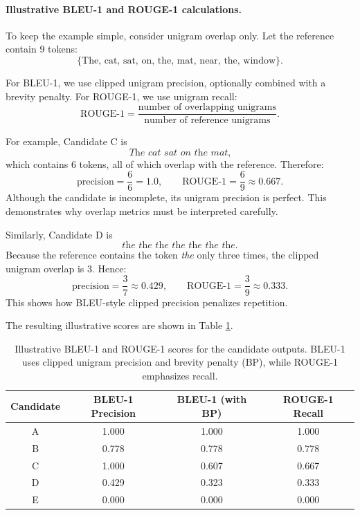 \documentclass{article}
\begin{document}
\paragraph{Illustrative BLEU-1 and ROUGE-1 calculations.}
To keep the example simple, consider unigram overlap only. Let the reference contain 9 tokens:
\[
\{\text{The, cat, sat, on, the, mat, near, the, window}\}.
\]

For BLEU-1, we use clipped unigram precision, optionally combined with a brevity penalty. For ROUGE-1, we use unigram recall:
\[
\text{ROUGE-1} = \frac{\text{number of overlapping unigrams}}{\text{number of reference unigrams}}.
\]

For example, Candidate C is
\[
\textit{The cat sat on the mat,}
\]
which contains 6 tokens, all of which overlap with the reference. Therefore:
\[
\text{precision} = \frac{6}{6} = 1.0,
\qquad
\text{ROUGE-1} = \frac{6}{9} \approx 0.667.
\]
Although the candidate is incomplete, its unigram precision is perfect. This demonstrates why overlap metrics must be interpreted carefully.

Similarly, Candidate D is
\[
\textit{the the the the the the the.}
\]
Because the reference contains the token \textit{the} only three times, the clipped unigram overlap is 3. Hence:
\[
\text{precision} = \frac{3}{7} \approx 0.429,
\qquad
\text{ROUGE-1} = \frac{3}{9} \approx 0.333.
\]
This shows how BLEU-style clipped precision penalizes repetition.

The resulting illustrative scores are shown in Table \ref{tab:llm_metric_example_overlap}.

\begin{table}[H]
\centering
\begin{tabular}{|c|c|c|c|}
\hline
\textbf{Candidate} & \textbf{BLEU-1 Precision} & \textbf{BLEU-1 (with BP)} & \textbf{ROUGE-1 Recall} \\
\hline
A & 1.000 & 1.000 & 1.000 \\
B & 0.778 & 0.778 & 0.778 \\
C & 1.000 & 0.607 & 0.667 \\
D & 0.429 & 0.323 & 0.333 \\
E & 0.000 & 0.000 & 0.000 \\
\hline
\end{tabular}
\caption{Illustrative BLEU-1 and ROUGE-1 scores for the candidate outputs. BLEU-1 uses clipped unigram precision and brevity penalty (BP), while ROUGE-1 emphasizes recall.}
\label{tab:llm_metric_example_overlap}
\end{table}
\end{document}
